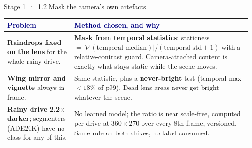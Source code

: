 \documentclass[10pt,aspectratio=169]{beamer}
\begin{document}
\begin{frame}{Stage 1 \,·\, 1.2 Mask the camera's own artefacts}
\vspace{-3pt}
\footnotesize\setlength{\tabcolsep}{5pt}\renewcommand{\arraystretch}{1.05}
\begin{tabularx}{\textwidth}{@{}>{\raggedright\arraybackslash}p{}>{\raggedright\arraybackslash}X@{}}
\toprule \textcolor{navy}{\textbf{Problem}} & \textcolor{navy}{\textbf{Method chosen, and why}} \\ \midrule
\textbf{Raindrops fixed on the lens} for the whole rainy drive. & \textbf{Mask from temporal statistics}: staticness $= |\nabla(\text{temporal median})| / (\text{temporal std} + 1)$ with a relative-contrast guard. Camera-attached content is exactly what stays static while the scene moves. \\
\addlinespace[3pt]
\textbf{Wing mirror and vignette} always in frame. & Same statistic, plus a \textbf{never-bright} test (temporal max $< 18\%$ of p99). Dead lens areas never get bright, whatever the scene. \\
\addlinespace[3pt]
\textbf{Rainy drive 2.2$\times$ darker}; segmenters (ADE20K) have no class for any of this. & No learned model; the ratio is near scale-free, computed per drive at $360\times270$ over every 8th frame, versioned. Same rule on both drives, no label consumed. \\
\bottomrule\end{tabularx}
\end{frame}
\end{document}
